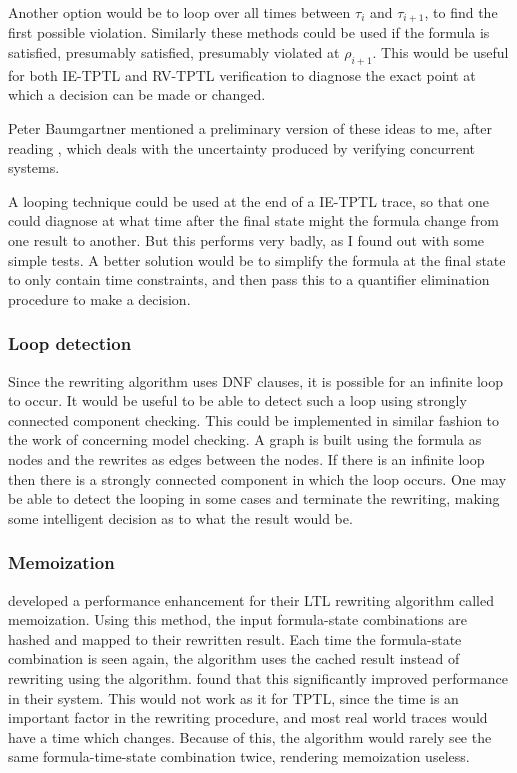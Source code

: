 \documentclass[a4paper]{article}
\begin{document}
Another option would be to loop over all times between $\tau_i$ and $\tau_{i+1}$, to find the first possible violation. Similarly these methods could be used if the formula is satisfied, presumably satisfied, presumably violated at $\rho_{i+1}$. This would be useful for both IE-TPTL and RV-TPTL verification to diagnose the exact point at which a decision can be made or changed.

Peter Baumgartner mentioned a preliminary version of these ideas to me, after reading \textcite{chai2014fivevalued}, which deals with the uncertainty produced by verifying concurrent systems.

A looping technique could be used at the end of a IE-TPTL trace, so that one could diagnose at what time after the final state might the formula change from one result to another. But this performs very badly, as I found out with some simple tests. A better solution would be to simplify the formula at the final state to only contain time constraints, and then pass this to a quantifier elimination procedure to make a decision.

\subsubsection{Loop detection}
Since the rewriting algorithm uses DNF clauses, it is possible for an infinite loop to occur. It would be useful to be able to detect such a loop using strongly connected component checking. This could be implemented in similar fashion to the work of \textcite{lichtenstein1985checking} concerning model checking. A graph is built using the formula as nodes and the rewrites as edges between the nodes. If there is an infinite loop then there is a strongly connected component in which the loop occurs. One may be able to detect the looping in some cases and terminate the rewriting, making some intelligent decision as to what the result would be.

\subsubsection{Memoization}
\textcite[180]{rosu2005rewriting} developed a performance enhancement for their LTL rewriting algorithm called memoization. Using this method, the input formula-state combinations are hashed and mapped to their rewritten result. Each time the formula-state combination is seen again, the algorithm uses the cached result instead of rewriting using the algorithm. \citeauthor{rosu2005rewriting} found that this significantly improved performance in their system. This would not work as it for TPTL, since the time is an important factor in the rewriting procedure, and most real world traces would have a time which changes. Because of this, the algorithm would rarely see the same formula-time-state combination twice, rendering memoization useless.
\end{document}
